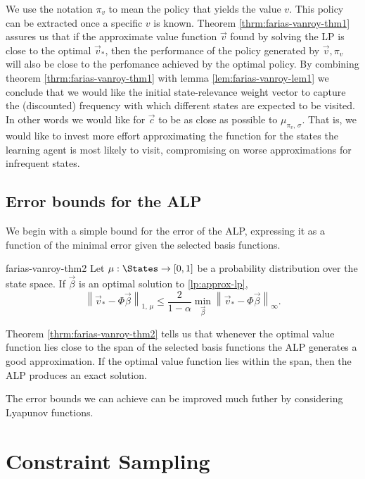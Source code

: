 We use the notation $\pi_v$ to mean the policy that yields the value $v$. This
policy can be extracted once a specific $v$ is known. Theorem
\ref{thrm:farias-vanroy-thm1} assures us that if the approximate value function
$\vec{v}$ found by solving the LP is close to the optimal $\vec{v}_{*}$, then
the performance of the policy generated by $\vec{v}, \pi_v$  will also be close
to the perfomance achieved by the optimal policy. By combining theorem
\ref{thrm:farias-vanroy-thm1} with lemma \ref{lem:farias-vanroy-lem1} we
conclude that we would like the initial state-relevance weight vector to capture
the (discounted) frequency with which different states are expected to be
visited. In other words we would like for $\vec{c}$ to be as close as possible
to $\mu_{\pi_v, \, \sigma}$. That is, we would like to invest more effort
approximating the function for the states the learning agent is most likely to
visit, compromising on worse approximations for infrequent states.

\subsection{Error bounds for the ALP}
We begin with a simple bound for the error of the ALP, expressing it as a
function of the minimal error given the selected basis functions.

\begin{thrm}{}{farias-vanroy-thm2}
    Let $\mu: \States \to [0,1]$ be a probability distribution over the state
    space. If $\vec{\beta}$ is an optimal solution to \eqref{lp:approx-lp},
    \begin{equation*}
        \left\| \vec{v}_* - \Phi \vec{\beta} \right\|_{1, \, \mu} \leq \frac{2}{1-\alpha} \min_{\vec{\beta}} \left\| \vec{v}_* - \Phi \vec{\beta} \right\|_{\infty}.
    \end{equation*}
\end{thrm}

Theorem \ref{thrm:farias-vanroy-thm2} tells us that whenever the optimal value
function lies close to the span of the selected basis functions the ALP
generates a good approximation. If the optimal value function lies within the
span, then the ALP produces an exact solution.

The error bounds we can achieve can be improved much futher by considering Lyapunov functions.

\section{Constraint Sampling}

